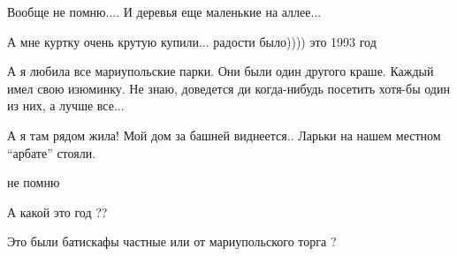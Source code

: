 
Вообще не помню.... И деревья еще маленькие на аллее...


А мне куртку очень крутую купили... радости было)))) это 1993 год


А я любила все мариупольские парки. Они были один другого краше. Каждый имел
свою изюминку. Не знаю, доведется ди когда-нибудь посетить хотя-бы один из них,
а лучше все...


А я там рядом жила! Мой дом за башней виднеется.. Ларьки на нашем местном \enquote{арбате} стояли.


не помню


А какой это год ??


Это были батискафы частные или от мариупольского торга ?

